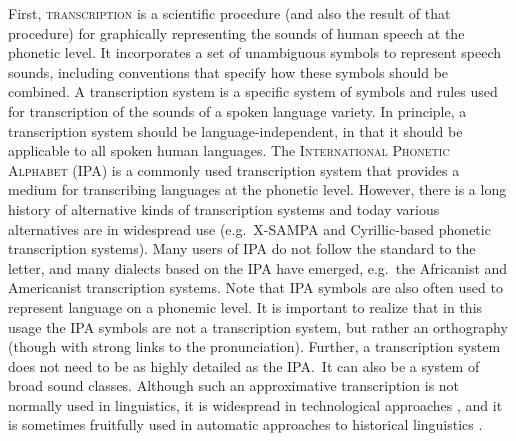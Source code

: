 First, \textsc{transcription} is a scientific procedure (and also
the result of that procedure) for graphically representing the sounds of human
speech at the phonetic level. It incorporates a set of unambiguous symbols to
represent speech sounds, including conventions that specify how these symbols
should be combined. A transcription system is a specific system of symbols and
rules used for transcription of the sounds of a spoken language variety. In
principle, a transcription system should be language-independent, in that it
should be applicable to all spoken human languages. The \textsc{International
Phonetic Alphabet} (IPA) is a commonly used transcription system that provides a
medium for transcribing languages at the phonetic level. However, there is a
long history of alternative kinds of transcription systems
\citep[see][]{Kemp2006} and today various alternatives are in widespread use
(e.g.~X-SAMPA and Cyrillic-based phonetic transcription systems). Many
users of IPA do not follow the standard to the letter, and many dialects based
on the IPA have emerged, e.g.~the Africanist and Americanist transcription
systems. Note that IPA symbols are also often used to represent language on a
phonemic level. It is important to realize that in this usage the IPA
symbols are not a transcription system, but rather an orthography (though with
strong links to the pronunciation). Further, a transcription system does not
need to be as highly detailed as the IPA.\ It can also be a system of broad sound
classes. Although such an approximative transcription is not normally used in
linguistics, it is widespread in technological approaches
\citetext{\citealp[Soundex and variants, e.g.~][391--392]{Knuth1973};
\citealp{postel1969,Beider2008}}, and it is sometimes fruitfully used in
automatic approaches to historical linguistics
\citep{Dolgopolsky1986,List2012esslli,Brown2013}.

